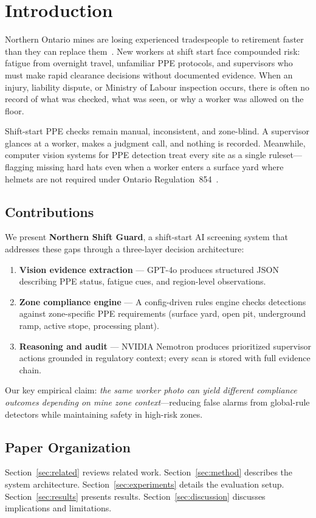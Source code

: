 \section{Introduction}
\label{sec:introduction}

Northern Ontario mines are losing experienced tradespeople to retirement faster than they can replace them~\cite{northernshiftguard2026}. New workers at shift start face compounded risk: fatigue from overnight travel, unfamiliar PPE protocols, and supervisors who must make rapid clearance decisions without documented evidence. When an injury, liability dispute, or Ministry of Labour inspection occurs, there is often no record of what was checked, what was seen, or why a worker was allowed on the floor.

Shift-start PPE checks remain manual, inconsistent, and zone-blind. A supervisor glances at a worker, makes a judgment call, and nothing is recorded. Meanwhile, computer vision systems for PPE detection treat every site as a single ruleset---flagging missing hard hats even when a worker enters a surface yard where helmets are not required under Ontario Regulation~854~\cite{ontario854}.

\subsection{Contributions}

We present \textbf{Northern Shift Guard}, a shift-start AI screening system that addresses these gaps through a three-layer decision architecture:

\begin{enumerate}
  \item \textbf{Vision evidence extraction} --- GPT-4o produces structured JSON describing PPE status, fatigue cues, and region-level observations.
  \item \textbf{Zone compliance engine} --- A config-driven rules engine checks detections against zone-specific PPE requirements (surface yard, open pit, underground ramp, active stope, processing plant).
  \item \textbf{Reasoning and audit} --- NVIDIA Nemotron produces prioritized supervisor actions grounded in regulatory context; every scan is stored with full evidence chain.
\end{enumerate}

Our key empirical claim: \emph{the same worker photo can yield different compliance outcomes depending on mine zone context}---reducing false alarms from global-rule detectors while maintaining safety in high-risk zones.

\subsection{Paper Organization}

Section~\ref{sec:related} reviews related work. Section~\ref{sec:method} describes the system architecture. Section~\ref{sec:experiments} details the evaluation setup. Section~\ref{sec:results} presents results. Section~\ref{sec:discussion} discusses implications and limitations.
